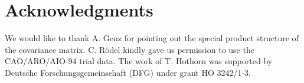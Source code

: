 \section*{Acknowledgments}

We would like to thank A. Genz for pointing out the special
product structure of the covariance matrix. C. R\"odel
kindly gave us permission to use the CAO/ARO/AIO-94 trial data.
The work of T. Hothorn was supported by Deutsche Forschungsgemeinschaft (DFG) 
under grant HO 3242/1-3.
